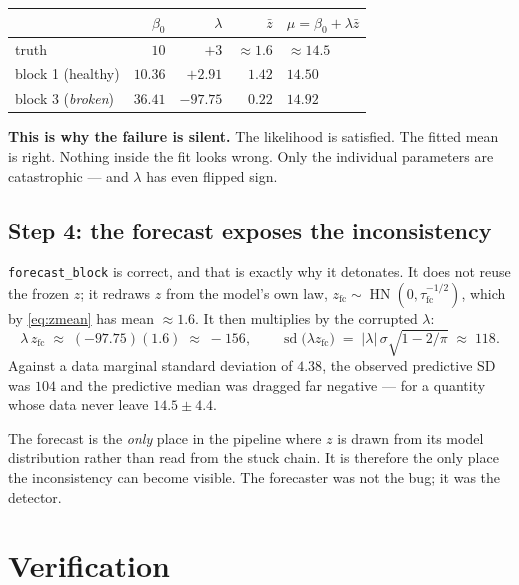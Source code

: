 \documentclass[11pt]{article}
\newcommand{\code}[1]{\texttt{#1}}
\DeclareMathOperator{\hn}{HN}
\begin{document}
\begin{center}
\begin{tabular}{lrrrl}
\toprule
 & $\beta_0$ & $\lambda$ & $\bar z$ & $\mu = \beta_0 + \lambda\bar z$ \\
\midrule
truth                  & $10$    & $+3$    & $\approx 1.6$ & $\approx 14.5$ \\
block 1 (healthy)      & $10.36$ & $+2.91$ & $1.42$ & $\mathbf{14.50}$ \\
block 3 (\emph{broken}) & $36.41$ & $\mathbf{-97.75}$ & $0.22$ & $\mathbf{14.92}$ \\
\bottomrule
\end{tabular}
\end{center}

\textbf{This is why the failure is silent.} The likelihood is satisfied. The
fitted mean is right. Nothing inside the fit looks wrong. Only the individual
parameters are catastrophic --- and $\lambda$ has even flipped sign.

\subsection{Step 4: the forecast exposes the inconsistency}

\code{forecast\_block} is correct, and that is exactly why it detonates. It does
not reuse the frozen $z$; it redraws $z$ from the model's own law,
$z_{\text{fc}} \sim \hn(0, \tau_{\text{fc}}^{-1/2})$, which by
\eqref{eq:zmean} has mean $\approx 1.6$. It then multiplies by the corrupted
$\lambda$:
\begin{equation}
  \lambda \, z_{\text{fc}} \;\approx\; (-97.75)(1.6) \;\approx\; -156 ,
  \qquad
  \operatorname{sd}\big(\lambda z_{\text{fc}}\big)
    \;=\; |\lambda|\,\sigma\sqrt{1 - 2/\pi} \;\approx\; 118 .
\end{equation}
Against a data marginal standard deviation of $4.38$, the observed predictive SD
was $104$ and the predictive median was dragged far negative --- for a
quantity whose data never leave $14.5 \pm 4.4$.

The forecast is the \emph{only} place in the pipeline where $z$ is drawn from
its model distribution rather than read from the stuck chain. It is therefore
the only place the inconsistency can become visible. The forecaster was not the
bug; it was the detector.

\section{Verification}
\end{document}
